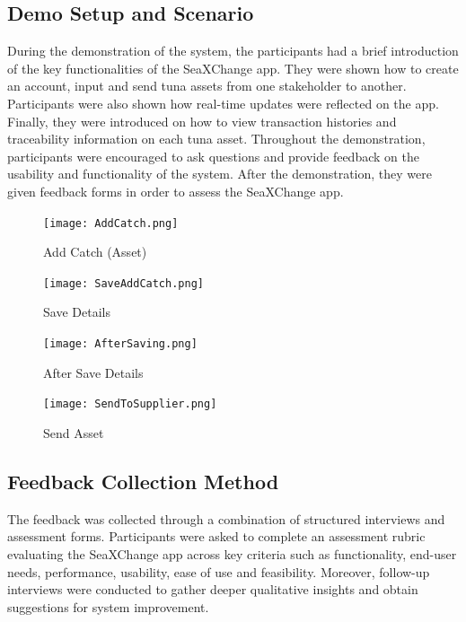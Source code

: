 \subsection{Demo Setup and Scenario}
	During the demonstration of the system, the participants had a brief introduction of the key functionalities of the SeaXChange app. They were shown how to create an account, input and send tuna assets from one stakeholder to another. Participants were also shown how real-time updates were reflected on the app. Finally, they were introduced on how to view transaction histories and traceability information on each tuna asset. Throughout the demonstration, participants were encouraged to ask questions and provide feedback on the usability and functionality of the system. After the demonstration, they were given feedback forms in order to assess the SeaXChange app. 
	
	\begin{figure}[H]
		\centering
		\texttt{[image: AddCatch.png]}
		\caption{Add Catch (Asset)}
		\label{fig:add_catch}
	\end{figure}
	
	\begin{figure}[H]
		\centering
		\texttt{[image: SaveAddCatch.png]}
		\caption{Save Details}
		\label{fig:save_details}
	\end{figure}
	
	\begin{figure}[H]
		\centering
		\texttt{[image: AfterSaving.png]}
		\caption{After Save Details}
		\label{fig:after_save}
	\end{figure}
	
	\begin{figure}[H]
		\centering
		\texttt{[image: SendToSupplier.png]}
		\caption{Send Asset}
		\label{fig:sendto_supplier}
	\end{figure}
	
\subsection{Feedback Collection Method}
	The feedback was collected through a combination of structured interviews and assessment forms. Participants were asked to complete an assessment rubric evaluating the SeaXChange app across key criteria such as functionality, end-user needs, performance, usability, ease of use and feasibility. Moreover, follow-up interviews were conducted to gather deeper qualitative insights and obtain suggestions for system improvement.
	
